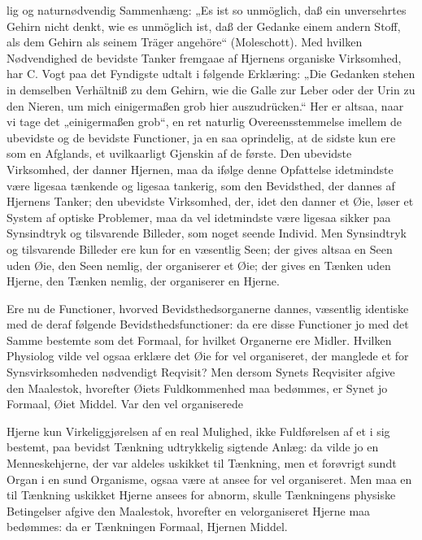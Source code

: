 \documentclass[12pt,a4paper]{book}
\begin{document}
lig og naturnødvendig Sammenhæng: „Es ist so unmöglich, daß ein unversehrtes
Gehirn nicht denkt, wie es unmöglich ist, daß der Gedanke einem andern Stoff,
als dem Gehirn als seinem Träger angehöre“ (Moleschott). Med hvilken
Nødvendighed de bevidste Tanker fremgaae af Hjernens organiske Virksomhed, har
C. Vogt paa det Fyndigste udtalt i følgende Erklæring: „Die Gedanken stehen in
demselben Verhältniß zu dem Gehirn, wie die Galle zur Leber oder der Urin zu
den Nieren, um mich einigermaßen grob hier auszudrücken.“ Her er altsaa, naar
vi tage det „einigermaßen grob“, en ret naturlig Overeensstemmelse imellem de
ubevidste og de bevidste Functioner, ja en saa oprindelig, at de sidste kun ere
som en Afglands, et uvilkaarligt Gjenskin af de første. Den ubevidste
Virksomhed, der danner Hjernen, maa da ifølge denne Opfattelse idetmindste være
ligesaa tænkende og ligesaa tankerig, som den Bevidsthed, der dannes af
Hjernens Tanker; den ubevidste Virksomhed, der, idet den danner et Øie, løser
et System af optiske Problemer, maa da vel idetmindste være ligesaa sikker paa
Synsindtryk og tilsvarende Billeder, som noget seende Individ. Men Synsindtryk
og tilsvarende Billeder ere kun for en væsentlig Seen; der gives altsaa en Seen
uden Øie, den Seen nemlig, der organiserer et Øie; der gives en Tænken uden
Hjerne, den Tænken nemlig, der organiserer en Hjerne.

Ere nu de Functioner, hvorved Bevidsthedsorganerne dannes, væsentlig identiske
med de deraf følgende Bevidsthedsfunctioner: da ere disse Functioner jo med det
Samme bestemte som det Formaal, for hvilket Organerne ere Midler. Hvilken
Physiolog vilde vel ogsaa erklære det Øie for vel organiseret, der manglede et
for Synsvirksomheden nødvendigt Reqvisit? Men dersom Synets Reqvisiter afgive
den Maalestok, hvorefter Øiets Fuldkommenhed maa bedømmes, er Synet jo Formaal,
Øiet Middel. Var den vel organiserede

\setcounter{footnote}{0}
Hjerne kun Virkeliggjørelsen af en real Mulighed, ikke Fuldførelsen af et i sig
bestemt, paa bevidst Tænkning udtrykkelig sigtende Anlæg: da vilde jo en
Menneskehjerne, der var aldeles uskikket til Tænkning, men et forøvrigt sundt
Organ i en sund Organisme, ogsaa være at ansee for vel organiseret. Men maa en
til Tænkning uskikket Hjerne ansees for abnorm, skulle Tænkningens physiske
Betingelser afgive den Maalestok, hvorefter en velorganiseret Hjerne maa
bedømmes: da er Tænkningen Formaal, Hjernen Middel.
\end{document}
